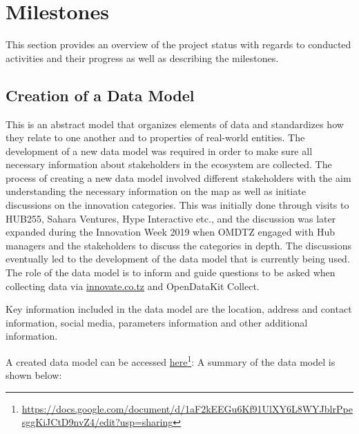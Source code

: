 \documentclass[a4paper,12pt,twoside]{article}
\begin{document}
\newpage
\section{Milestones}
This section provides an overview of the project status with regards to conducted activities and their progress as well as describing the milestones.

\subsection{Creation of a Data Model}
This is an abstract model that organizes elements of data and standardizes how they relate to one another and to properties of real-world entities. The development of a new data model was required in order to make sure all necessary information about stakeholders in the ecosystem are collected. The process of creating a new data model involved different stakeholders with the aim understanding the necessary information on the map as well as initiate discussions on the innovation categories. This was initially done through visits to HUB255, Sahara Ventures, Hype Interactive etc., and the discussion was later expanded during the Innovation Week 2019 when OMDTZ engaged with Hub managers and the stakeholders to discuss the categories in depth. The discussions eventually led to the development of the data model that is currently being used. The role of the data model is to inform and guide questions to be asked when collecting data via \href{innovate.co.tz}{innovate.co.tz} and OpenDataKit Collect.

Key information included in the data model are the location, address and contact information, social media, parameters information and other additional information. 

A created data model can be accessed \href{https://docs.google.com/document/d/1aF2kEEGu6Kf91UlXY6L8WYJblrPpesggKiJCtD9nvZ4/edit?usp=sharing}{here}\footnote{\url{https://docs.google.com/document/d/1aF2kEEGu6Kf91UlXY6L8WYJblrPpesggKiJCtD9nvZ4/edit?usp=sharing}}: A summary of the data model is shown below:
\end{document}
